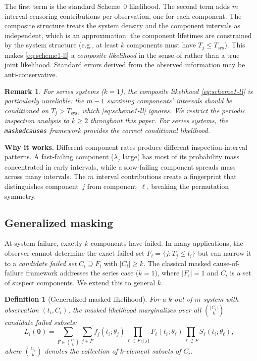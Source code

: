 \documentclass[12pt]{article}
\newtheorem{definition}{Definition}
\newtheorem{remark}{Remark}
\newcommand{\Tsys}{T_{\mathrm{sys}}}
\newcommand{\btheta}{\boldsymbol{\theta}}
\begin{document}
The first term is the standard Scheme~0 likelihood.  The second term adds
$m$ interval-censoring contributions per observation, one for each component.
The composite structure treats the system density and the component intervals
as independent, which is an approximation: the component lifetimes are
constrained by the system structure (e.g., at least $k$ components must have
$T_j \leq \Tsys$).  This makes \eqref{eq:scheme1-ll} a
\emph{composite likelihood} in the sense of \citet{VarinReidFirth2011} rather
than a true joint likelihood.  Standard errors derived from the observed
information may be anti-conservative.

\begin{remark}\label{rem:series-breakdown}
For series systems ($k = 1$), the composite likelihood
\eqref{eq:scheme1-ll} is particularly unreliable: the $m - 1$ surviving
components' intervals should be conditioned on $T_j > \Tsys$, which
\eqref{eq:scheme1-ll} ignores.  We restrict the periodic inspection
analysis to $k \geq 2$ throughout this paper.  For series systems, the
\texttt{maskedcauses} framework \citep{LinUsherGuess1993} provides the
correct conditional likelihood.
\end{remark}

\textbf{Why it works.}
Different component rates produce different inspection-interval patterns.
A fast-failing component ($\lambda_j$ large) has most of its probability
mass concentrated in early intervals, while a slow-failing component
spreads mass across many intervals.  The $m$ interval contributions create
a fingerprint that distinguishes component~$j$ from component~$\ell$,
breaking the permutation symmetry.

\subsection{Generalized masking}\label{sec:masking}

At system failure, exactly $k$ components have failed.  In many
applications, the observer cannot determine the exact failed set
$F_i = \{j : T_j \leq t_i\}$ but can narrow it to a \emph{candidate
failed set} $C_i \supseteq F_i$ with $|C_i| \geq k$.  The classical
masked cause-of-failure framework \citep{Miyakawa1984, LinUsherGuess1993}
addresses the series case ($k = 1$), where $|F_i| = 1$ and $C_i$ is a
set of suspect components.  We extend this to general $k$.

\begin{definition}[Generalized masked likelihood]\label{def:masked-ll}
For a $k$-out-of-$m$ system with observation $(t_i, C_i)$, the masked
likelihood marginalizes over all $\binom{|C_i|}{k}$ candidate failed
subsets:
\begin{equation}\label{eq:masked-ll}
  L_i(\btheta) = \sum_{F \in \binom{C_i}{k}}
    \sum_{j \in F} f_j(t_i; \theta_j)
    \prod_{\ell \in F \setminus \{j\}} F_\ell(t_i; \theta_\ell)
    \prod_{\ell \notin F} S_\ell(t_i; \theta_\ell),
\end{equation}
where $\binom{C_i}{k}$ denotes the collection of $k$-element subsets of
$C_i$.
\end{definition}
\end{document}
